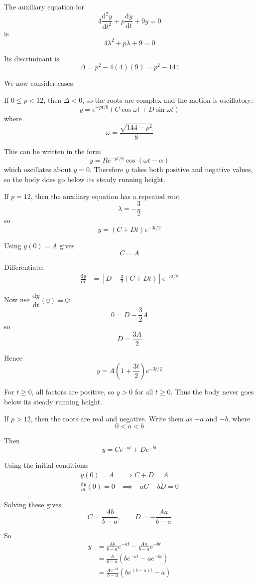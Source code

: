 \documentclass[leqno]{article}
\begin{document}
\begin{enumerate}[
  label=\textbf{\arabic*.},
  leftmargin=*,
  topsep=0pt,
  partopsep=0pt,
  parsep=0pt
]
\begin{tcolorbox}[colback=white, colframe=scarlet, title={\textbf{Solution}}, breakable, grow to left by=6mm, grow to right by=10mm]
\begin{enumerate}[label=\textbf{(\alph*)}]
  The auxiliary equation for
  \[
  4\frac{\mathrm{d}^2y}{\mathrm{d}t^2}+p\frac{\mathrm{d}y}{\mathrm{d}t}+9y=0
  \]
  is
  \[
  4\lambda^2+p\lambda+9=0
  \]

  Its discriminant is
  \[
  \Delta=p^2-4(4)(9)=p^2-144
  \]

  We now consider cases.

  If $0\le p<12$, then $\Delta<0$, so the roots are complex and the motion is oscillatory:
  \[
  y=e^{-pt/8}\left(C\cos \omega t+D\sin \omega t\right)
  \]
  where
  \[
  \omega=\frac{\sqrt{144-p^2}}{8}
  \]

  This can be written in the form
  \[
  y=Re^{-pt/8}\cos(\omega t-\alpha)
  \]
  which oscillates about $y=0$. Therefore $y$ takes both positive and negative values, so the body does go below its steady running height.

  If $p=12$, then the auxiliary equation has a repeated root
  \[
  \lambda=-\frac{3}{2}
  \]
  so
  \[
  y=(C+Dt)e^{-3t/2}
  \]

  Using $y(0)=A$ gives
  \[
  C=A
  \]

  Differentiate:
  \begin{align*}
  \frac{\mathrm{d}y}{\mathrm{d}t}
  &=\left[D-\frac{3}{2}(C+Dt)\right]e^{-3t/2}
  \end{align*}

  Now use $\dfrac{\mathrm{d}y}{\mathrm{d}t}(0)=0$:
  \[
  0=D-\frac{3}{2}A
  \]
  so
  \[
  D=\frac{3A}{2}
  \]

  Hence
  \[
  y=A\left(1+\frac{3t}{2}\right)e^{-3t/2}
  \]

  For $t\ge0$, all factors are positive, so $y>0$ for all $t\ge0$. Thus the body never goes below its steady running height.

  If $p>12$, then the roots are real and negative. Write them as $-a$ and $-b$, where
  \[
  0<a<b
  \]

  Then
  \[
  y=Ce^{-at}+De^{-bt}
  \]

  Using the initial conditions:
  \begin{align*}
  y(0)=A &\implies C+D=A \\
  \frac{\mathrm{d}y}{\mathrm{d}t}(0)=0 &\implies -aC-bD=0
  \end{align*}

  Solving these gives
  \[
  C=\frac{Ab}{b-a}, \qquad D=-\frac{Aa}{b-a}
  \]

  So
  \begin{align*}
  y&=\frac{Ab}{b-a}e^{-at}-\frac{Aa}{b-a}e^{-bt} \\
   &=\frac{A}{b-a}\left(be^{-at}-ae^{-bt}\right) \\
   &=\frac{Ae^{-bt}}{b-a}\left(be^{(b-a)t}-a\right)
  \end{align*}


\end{enumerate}
\end{tcolorbox}
\end{enumerate}
\end{document}
